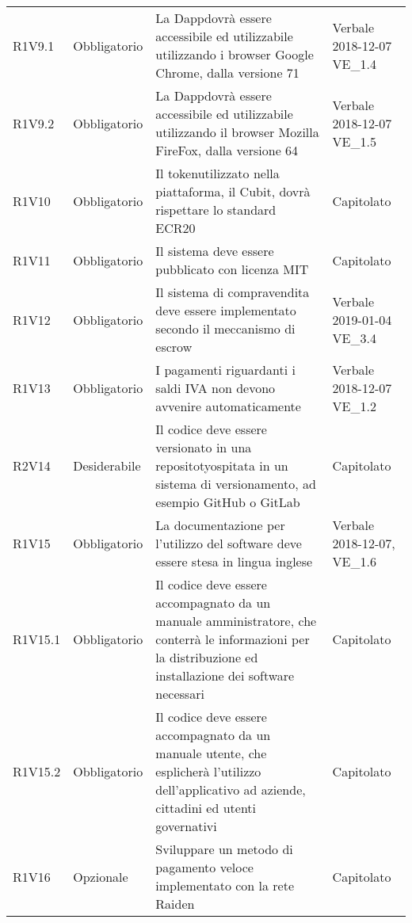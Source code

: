 \begin{longtable}{ >{\centering}p{} >{\centering}p{}
			>{\raggedright}p{} >{\centering}p{}}
R1V9.1	&	Obbligatorio	&	La Dapp\glosp dovrà essere accessibile ed utilizzabile utilizzando i browser Google Chrome, dalla versione 71	&	Verbale 2018-12-07  VE\_1.4	\tabularnewline
R1V9.2	&	Obbligatorio	&	La Dapp\glosp dovrà essere accessibile ed utilizzabile utilizzando il browser Mozilla FireFox, dalla versione 64	&	Verbale 2018-12-07 VE\_1.5	\tabularnewline
R1V10	&	Obbligatorio	&	Il token\glosp utilizzato nella piattaforma, il Cubit\glo, dovrà rispettare lo standard ECR20\glo	&	Capitolato	\tabularnewline
R1V11	&	Obbligatorio	&	Il sistema deve essere pubblicato con licenza MIT	&	Capitolato	\tabularnewline
R1V12	&	Obbligatorio	&	Il sistema di compravendita deve essere implementato secondo il meccanismo di escrow\glo	&	Verbale 2019-01-04  VE\_3.4	\tabularnewline
R1V13	&	Obbligatorio	&	I pagamenti riguardanti i saldi IVA non devono avvenire automaticamente	&	Verbale 2018-12-07 VE\_1.2	\tabularnewline
R2V14	&	Desiderabile	&	Il codice deve essere versionato in una repositoty\glosp ospitata in un sistema di versionamento, ad esempio GitHub o GitLab	&	Capitolato	\tabularnewline
R1V15	&	Obbligatorio	&	La documentazione per l'utilizzo del software deve essere stesa in lingua inglese	&	Verbale 2018-12-07, VE\_1.6	\tabularnewline
R1V15.1	&	Obbligatorio	&	Il codice deve essere accompagnato da un manuale amministratore, che conterrà le informazioni per la distribuzione ed installazione dei software necessari	&	Capitolato	\tabularnewline
R1V15.2	&	Obbligatorio	&	Il codice deve essere accompagnato da un manuale utente, che esplicherà l'utilizzo dell'applicativo ad aziende, cittadini ed utenti governativi	&	Capitolato	\tabularnewline
R1V16	&	Opzionale	&	Sviluppare un metodo di pagamento veloce implementato con la rete Raiden\glo	&	Capitolato	\tabularnewline
		
		
		
		
	\end{longtable}
